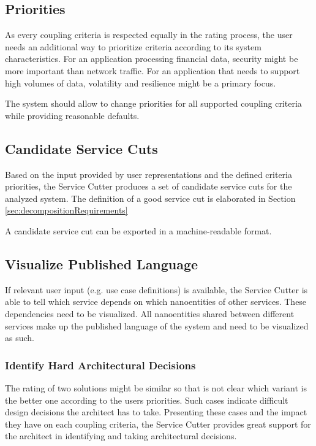 \subsection{Priorities}

As every coupling criteria is respected equally in the rating process, the user needs an additional way to prioritize criteria according to its system characteristics. For an application processing financial data, security might be more important than network traffic. For an application that needs to support high volumes of data, volatility and resilience might be a primary focus.

The system should allow to change priorities for all supported coupling criteria while providing reasonable defaults. 

\subsection{Candidate Service Cuts}

Based on the input provided by user representations and the defined criteria priorities, the Service Cutter produces a set of candidate service cuts for the analyzed system. The definition of a good service cut is elaborated in Section \ref{sec:decompositionRequirements}

A candidate service cut can be exported in a machine-readable format.

\subsection{Visualize Published Language}

If relevant user input (e.g. use case definitions) is available, the Service Cutter is able to tell which service depends on which nanoentities of other services. These dependencies need to be visualized. All nanoentities shared between different services make up the published language of the system and need to be visualized as such.

\subsubsection{Identify Hard Architectural Decisions}
\label{subsec:identifyHardADs}

The rating of two solutions might be similar so that is not clear which variant is the better one according to the users priorities. Such cases indicate difficult design decisions the architect has to take. Presenting these cases and the impact they have on each coupling criteria, the Service Cutter provides great support for the architect in identifying and taking architectural decisions.

